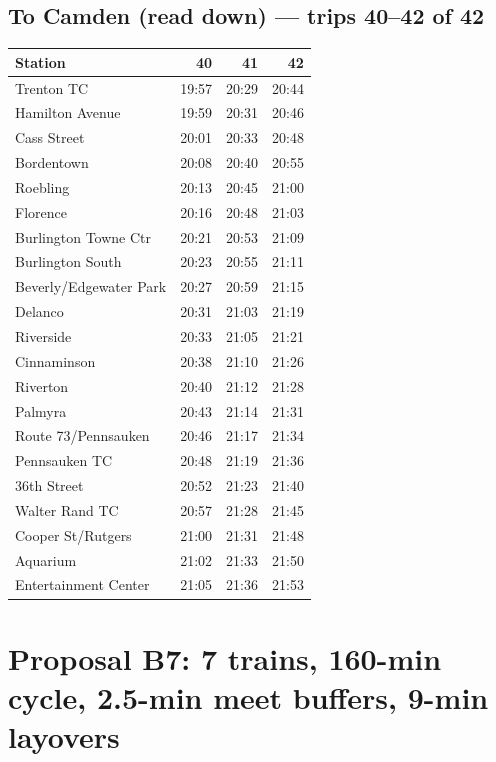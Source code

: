 \subsection*{To Camden (read down) --- trips 40--42 of 42}
\begin{center}\footnotesize\setlength{\tabcolsep}{3pt}\begin{tabular}{@{}lrrr@{}}\toprule
Station & 40 & 41 & 42 \\\midrule
Trenton TC & 19:57 & 20:29 & 20:44 \\
Hamilton Avenue & 19:59 & 20:31 & 20:46 \\
Cass Street & 20:01 & 20:33 & 20:48 \\
Bordentown & 20:08 & 20:40 & 20:55 \\
Roebling & 20:13 & 20:45 & 21:00 \\
Florence & 20:16 & 20:48 & 21:03 \\
Burlington Towne Ctr & 20:21 & 20:53 & 21:09 \\
Burlington South & 20:23 & 20:55 & 21:11 \\
Beverly/Edgewater Park & 20:27 & 20:59 & 21:15 \\
Delanco & 20:31 & 21:03 & 21:19 \\
Riverside & 20:33 & 21:05 & 21:21 \\
Cinnaminson & 20:38 & 21:10 & 21:26 \\
Riverton & 20:40 & 21:12 & 21:28 \\
Palmyra & 20:43 & 21:14 & 21:31 \\
Route 73/Pennsauken & 20:46 & 21:17 & 21:34 \\
Pennsauken TC & 20:48 & 21:19 & 21:36 \\
36th Street & 20:52 & 21:23 & 21:40 \\
Walter Rand TC & 20:57 & 21:28 & 21:45 \\
Cooper St/Rutgers & 21:00 & 21:31 & 21:48 \\
Aquarium & 21:02 & 21:33 & 21:50 \\
Entertainment Center & 21:05 & 21:36 & 21:53 \\
\bottomrule\end{tabular}\end{center}
\clearpage
\section{Proposal B7: 7 trains, 160-min cycle, 2.5-min meet buffers, 9-min layovers}\label{tt:proposal_B7}
